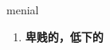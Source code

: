
\begin{frame}
{\huge menial}
\begin{center}
\begin{enumerate}\Large
  \item \textbf{卑贱的，低下的}
\end{enumerate}
\end{center}
\end{frame}
